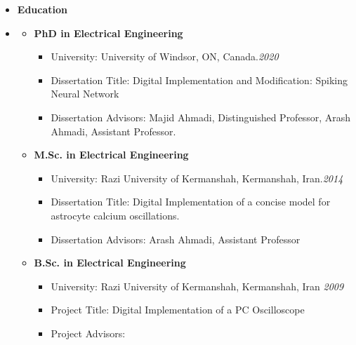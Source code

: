\begin {itemize} \item [] {\bf \Large  Education }  \vspace{-1.5em}
\item []  {\bf \hrulefill } 
\mdseries \normalsize 
\begin {itemize}
\item [$\bullet$] \bf {\mtf \normalsize PhD in Electrical Engineering} \mdseries
    \begin {itemize}
        \item [-]  {   University:} 
          \small University of Windsor, ON, Canada.\small \hspace{3.8cm}\textit{2020}\normalsize
        \item [-]   {   Dissertation Title:} 
               Digital Implementation and Modification: Spiking Neural Network
        \item [-]  {   Dissertation Advisors:} 
                Majid Ahmadi, Distinguished Professor, 
              Arash Ahmadi, Assistant Professor.
    \end {itemize} \vspace{0.3cm}
\item [$\bullet$]  \bf {\mtf \normalsize  M.Sc. in Electrical Engineering } \mdseries
    \begin {itemize}
        \item [-]  {   University:} 
          Razi University of Kermanshah, Kermanshah, Iran.\small \hspace{0.85cm}\textit{2014}\normalsize
        \item [-]   {   Dissertation Title:} 
               Digital Implementation of a concise model for astrocyte calcium oscillations.
        \item [-]  {   Dissertation Advisors:} 
                Arash Ahmadi, Assistant Professor
    \end {itemize}\vspace{0.3cm}
\item [$\bullet$] \bf {\mtf  \normalsize B.Sc. in Electrical Engineering} \mdseries
    \begin {itemize}
    \item [-] {University:} {\small Razi University of Kermanshah, Kermanshah, Iran}\small  \hspace{1.6cm} \textit{2009}\normalsize 
    \item [-]   {   Project Title:} 
               Digital Implementation of a PC Oscilloscope
        \item [-]  {   Project Advisors:} 

\end{itemize}
\end{itemize}
\end{itemize}
